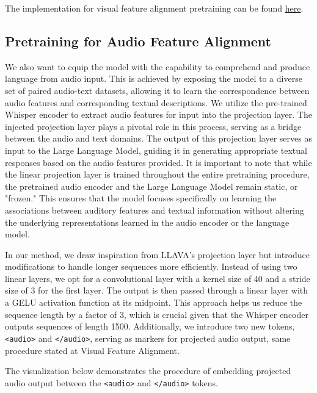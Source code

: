 \documentclass[preprint]{article}
\begin{document}
The implementation for visual feature alignment pretraining can be found \href{https://github.com/mesolitica/multimodal-LLM/tree/master/vision-only}{here}.

\subsection{Pretraining for Audio Feature Alignment}

We also want to equip the model with the capability to comprehend and produce language from audio input. This is achieved by exposing the model to a diverse set of paired audio-text datasets, allowing it to learn the correspondence between audio features and corresponding textual descriptions. We utilize the pre-trained Whisper encoder to extract audio features for input into the projection layer. The injected projection layer plays a pivotal role in this process, serving as a bridge between the audio and text domains. The output of this projection layer serves as input to the Large Language Model, guiding it in generating appropriate textual responses based on the audio features provided. It is important to note that while the linear projection layer is trained throughout the entire pretraining procedure, the pretrained audio encoder and the Large Language Model remain static, or "frozen." This ensures that the model focuses specifically on learning the associations between auditory features and textual information without altering the underlying representations learned in the audio encoder or the language model.

In our method, we draw inspiration from LLAVA's \cite{liu2023visual} projection layer but introduce modifications to handle longer sequences more efficiently. Instead of using two linear layers, we opt for a convolutional layer with a kernel size of 40 and a stride size of 3 for the first layer. The output is then passed through a linear layer with a GELU activation function at its midpoint. This approach helps us reduce the sequence length by a factor of 3, which is crucial given that the Whisper encoder outputs sequences of length 1500. Additionally, we introduce two new tokens, \texttt{<audio>} and \texttt{</audio>}, serving as markers for projected audio output, same procedure stated at Visual Feature Alignment.

\newpage

The visualization below demonstrates the procedure of embedding projected audio output between the \texttt{<audio>} and \texttt{</audio>} tokens.
\end{document}
